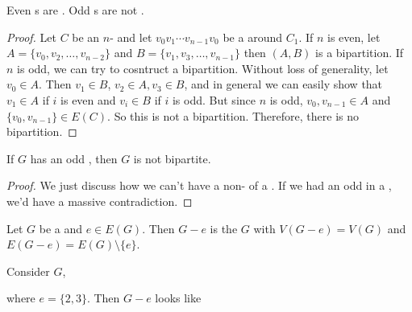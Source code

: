 \documentclass[english, 11pt]{article}
\begin{document}
\begin{thrm}
  Even s are . Odd s are not .
\end{thrm}
\begin{proof}
  Let $C$ be an $n$- and let $v_0v_1\cdots v_{n-1}v_0$ be a  around $C_1$. If $n$ is even, let $A = \{v_0,v_2,\ldots,v_{n-2}\}$ and $B = \{v_1,v_3,\ldots,v_{n-1}\}$ then $(A,B)$ is a bipartition. If $n$ is odd, we can try to cosntruct a bipartition. Without loss of generality, let $v_0 \in A$. Then $v_1 \in B$, $v_2 \in A, v_3 \in B$, and in general we can easily show that $v_1 \in A$ if $i$ is even and $v_i \in B$ if $i$ is odd. But since $n$ is odd, $v_0, v_{n-1} \in A$ and $\{v_0, v_{n-1} \} \in E(C)$. So this is not a bipartition. Therefore, there is no bipartition.
\end{proof}

\begin{cor}
  If $G$ has an odd , then $G$ is not bipartite.
\end{cor}

 \begin{proof}
   We just discuss how we can't have a non-  of a  . If we had an odd  in a  , we'd have a massive contradiction.
 \end{proof}

 \begin{defn}\label{edge deletion}
 Let $G$ be a  and $e \in E(G)$. Then $G - e$ is the  $G$ with $V(G - e) = V(G)$ and $E(G-e) = E(G) \setminus \{e\}$.
 \end{defn}

 \begin{exmp} Consider $G$,
     \begin{center}
\end{center}
where $e = \{2,3\}$. Then $G - e$ looks like
     \begin{center}
\end{center}
 \end{exmp}
\end{document}
